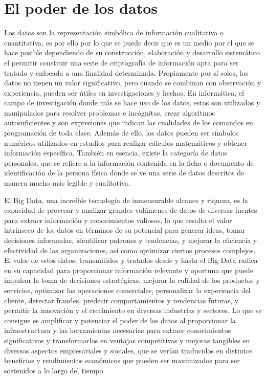 \documentclass[
  letterpaper,
  DIV=11,
  numbers=noendperiod]{scrreprt}
\begin{document}
\hypertarget{el-poder-de-los-datos}{%
\section{El poder de los datos}\label{el-poder-de-los-datos}}

Los datos son la representación simbólica de información cualitativa o
cuantitativa, es por ello por lo que se puede decir que es un medio por
el que se hace posible dependiendo de su construcción, elaboración y
desarrollo sistemático el permitir construir una serie de criptografía
de información apta para ser tratado y enfocada a una finalidad
determinada. Propiamente por sí solos, los datos no tienen un valor
significativo, pero cuando se combinan con observación y experiencia,
pueden ser útiles en investigaciones y hechos. En informática, el campo
de investigación donde más se hace uso de los datos, estos son
utilizados y manipulados para resolver problemas e incógnitas, crear
algoritmos autosuficientes y son expresiones que indican las cualidades
de los comandos en programación de toda clase. Además de ello, los datos
pueden ser símbolos numéricos utilizados en estudios para realizar
cálculos matemáticos y obtener información específica. También en
esencia, existe la categoría de datos personales, que se refiere a la
información contenida en la ficha o documento de identificación de la
persona física donde se ve una serie de datos descritos de manera mucho
más legible y cualitativa.

El Big Data, una increíble tecnología de inmensurable alcance y riqueza,
es la capacidad de procesar y analizar grandes volúmenes de datos de
diversas fuentes para extraer información y conocimientos valiosos, lo
que resalta el valor intrínseco de los datos en términos de su potencial
para generar ideas, tomar decisiones informadas, identificar patrones y
tendencias, y mejorar la eficiencia y efectividad de las organizaciones,
así como optimizar ciertos procesos complejos. El valor de estos datos,
transmitidos y tratados desde y hasta el Big Data radica en su capacidad
para proporcionar información relevante y oportuna que puede impulsar la
toma de decisiones estratégicas, mejorar la calidad de los productos y
servicios, optimizar las operaciones comerciales, personalizar la
experiencia del cliente, detectar fraudes, predecir comportamientos y
tendencias futuras, y permitir la innovación y el crecimiento en
diversas industrias y sectores. Lo que se consigue es amplificar y
potenciar el poder de los datos al proporcionar la infraestructura y las
herramientas necesarias para extraer conocimientos significativos y
transformarlos en ventajas competitivas y mejoras tangibles en diversos
aspectos empresariales y sociales, que se verían traducidos en distintos
beneficios y rendimientos económicos que pueden ser maximizados para ser
sostenidos a lo largo del tiempo.
\end{document}
